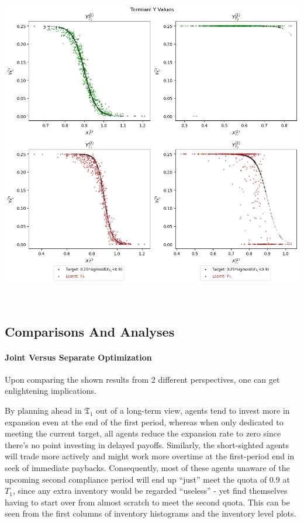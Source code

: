 \documentclass[a4paper,10pt]{article}
\newcommand{\1}{\mathbf{1}}
\begin{document}
\begin{minipage}{\textwidth}
\begin{minipage}[h]{0.65\textwidth}
    \includegraphics[]{FinalReports/Illustration_diagrams/Seprt-2A2P-Sigmoid-ResExamples/sigmoid_target.png}\\
    \label{fig:terminal-values-sep}
  \end{minipage}\\
  \vspace{-20pt}
\end{minipage}


\newpage  %

\subsection{Comparisons And Analyses}

\paragraph{Joint Versus Separate Optimization}

Upon comparing the shown results from 2 different perspectives, one can
get enlightening implications.

By planning ahead in \(\mathfrak{T}_1\) out of a long-term view,
agents tend to invest more in expansion even at the end of the first
period, whereas when only dedicated to meeting the current target, all
agents reduce the expansion rate to zero since there's no point
investing in delayed payoffs. Similarly, the short-sighted agents will
trade more actively and might work more overtime at the first-period end
in seek of immediate paybacks. Consequently, most of these agents
unaware of the upcoming second compliance period will end up ``just''
meet the quota of 0.9 at \(T_1\), since any extra inventory would be
regarded ``useless'' - yet find themselves having to start over from
almost scratch to meet the second quota. This can be seen from
the first columns of inventory histograms and the inventory level plots.
\end{document}
